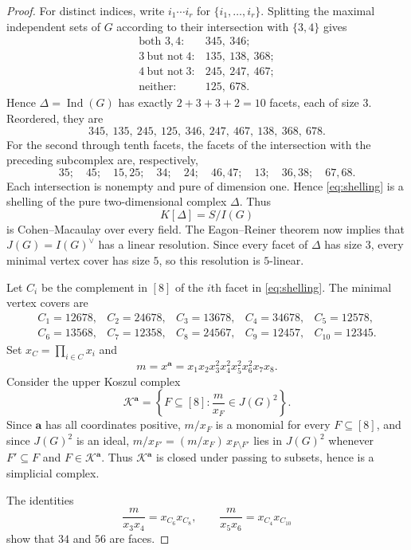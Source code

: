 \documentclass[11pt]{amsart}
\theoremstyle{remark}
\newcommand{\Ind}{\operatorname{Ind}}
\begin{document}
\begin{proof}
For distinct indices, write $i_1\cdots i_r$ for
$\{i_1,\ldots,i_r\}$.  Splitting the maximal independent sets of $G$
according to their intersection with $\{3,4\}$ gives
\[
\begin{array}{ll}
\text{both }3,4\colon & 345,\ 346;\\
3\ \text{but not}\ 4\colon & 135,\ 138,\ 368;\\
4\ \text{but not}\ 3\colon & 245,\ 247,\ 467;\\
\text{neither}\colon & 125,\ 678.
\end{array}
\]
Hence $\Delta=\Ind(G)$ has exactly $2+3+3+2=10$ facets, each of size
$3$.  Reordered, they are
\[
345,\ 135,\ 245,\ 125,\ 346,\ 247,\ 467,\ 138,\ 368,\ 678.
\tag{1}\label{eq:shelling}
\]
For the second through tenth facets, the facets of the intersection
with the preceding subcomplex are, respectively,
\[
35;\quad 45;\quad 15,25;\quad 34;\quad 24;\quad
46,47;\quad 13;\quad 36,38;\quad 67,68.
\]
Each intersection is nonempty and pure of dimension one.  Hence
\eqref{eq:shelling} is a shelling of the pure two-dimensional complex
$\Delta$.  Thus
\[
K[\Delta]=S/I(G)
\]
is Cohen--Macaulay over every field.  The Eagon--Reiner theorem
\cite{EagonReiner} now implies that $J(G)=I(G)^\vee$ has a linear
resolution.  Since every facet of $\Delta$ has size $3$, every minimal
vertex cover has size $5$, so this resolution is $5$-linear.

Let $C_i$ be the complement in $[8]$ of the $i$th facet in
\eqref{eq:shelling}.  The minimal vertex covers are
\[
\begin{array}{lllll}
C_1=12678, & C_2=24678, & C_3=13678, & C_4=34678, & C_5=12578,\\
C_6=13568, & C_7=12358, & C_8=24567, & C_9=12457, & C_{10}=12345.
\end{array}
\]
Set $x_C=\prod_{i\in C}x_i$ and
\[
m=x^{\mathbf a}
  =x_1x_2x_3^2x_4^2x_5^2x_6^2x_7x_8.
\]
Consider the upper Koszul complex
\[
\mathcal K^{\mathbf a}
 =\left\{
 F\subseteq[8]:
 \frac{m}{x_F}\in J(G)^2
 \right\}.
\]
Since $\mathbf a$ has all coordinates positive, $m/x_F$ is a monomial
for every $F\subseteq[8]$, and since $J(G)^2$ is an ideal,
$m/x_{F'}=(m/x_F)\,x_{F\setminus F'}$ lies in $J(G)^2$ whenever
$F'\subseteq F$ and $F\in\mathcal K^{\mathbf a}$.  Thus
$\mathcal K^{\mathbf a}$ is closed under passing to subsets, hence is a
simplicial complex.

The identities
\[
\frac{m}{x_3x_4}=x_{C_6}x_{C_8},
\qquad
\frac{m}{x_5x_6}=x_{C_4}x_{C_{10}}
\tag{2}\label{eq:positive}
\]
show that $34$ and $56$ are faces.


\end{proof}
\end{document}
